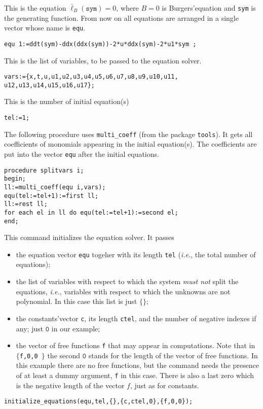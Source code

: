 \documentclass[12pt]{amsart}
\theoremstyle{definition}
\begin{document}
This is the equation $\bar\ell_B(\mathtt{sym})=0$, where $B=0$ is
Burgers'equation and \texttt{sym} is the generating function. From now on all
equations are arranged in a single vector whose name is \texttt{equ}.
\begin{verbatim}
equ 1:=ddt(sym)-ddx(ddx(sym))-2*u*ddx(sym)-2*u1*sym ;
\end{verbatim}

This is the list of variables, to be passed to the equation solver.
\begin{verbatim}
vars:={x,t,u,u1,u2,u3,u4,u5,u6,u7,u8,u9,u10,u11,
u12,u13,u14,u15,u16,u17};
\end{verbatim}

This is the number of initial equation(s)
\begin{verbatim}
tel:=1;
\end{verbatim}

The following procedure uses \texttt{multi\_coeff} (from the package
\texttt{tools}).  It gets all coefficients of monomials appearing in the
initial equation(s).  The coefficients are put into the vector \texttt{equ}
after the initial equations.
\begin{verbatim}
procedure splitvars i;
begin;
ll:=multi_coeff(equ i,vars);
equ(tel:=tel+1):=first ll;
ll:=rest ll;
for each el in ll do equ(tel:=tel+1):=second el;
end;
\end{verbatim}

This command initializes the equation solver.  It passes
\begin{itemize}
  \item the equation vector \texttt{equ} togeher with its length \texttt{tel}
    (\emph{i.e.}, the total number of equations);
  \item the list of variables with respect to which the system \emph{must not}
    split the equations, \emph{i.e.}, variables with respect to which the
    unknowns are not polynomial. In this case this list is just $\{\}$;
  \item the constants'vector \texttt{c}, its length \texttt{ctel}, and the
    number of negative indexes if any; just $\texttt{0}$ in our example;
  \item the vector of free functions \texttt{f} that may appear in
    computations. Note that in \texttt{$\{$f,0,0 $\}$} the second $\texttt{0}$
    stands for the length of the vector of free functions. In this example
    there are no free functions, but the command needs the presence of at least
    a dummy argument, \texttt{f} in this case. There is also a last zero which
    is the negative length of the vector $f$, just as for constants.
  \end{itemize}
\begin{verbatim}
initialize_equations(equ,tel,{},{c,ctel,0},{f,0,0});
\end{verbatim}
\end{document}

